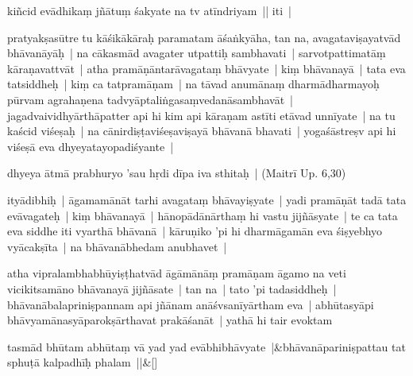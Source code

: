 \documentclass[article,12pt,a4paper]{memoir}%
\newcounter{parCount}
\begin{document}
	  
	  \pstart \leavevmode%
	kiñcid evādhikaṃ jñātuṃ śakyate na tv atīndriyam || iti | 
	{}
	\pend%
      

	  
	  \pstart \leavevmode%
	\label{thakur75-9.20}pratyakṣasūtre tu kāśikākāraḥ paramatam āśaṅkyāha, tan na, avagataviṣayatvād bhāvanāyāḥ | na cākasmād avagater utpattiḥ sambhavati | sarvotpattimatāṃ kāraṇavattvāt | atha pramāṇāntarāvagataṃ bhāvyate | kiṃ bhāvanayā | tata eva tatsiddheḥ | kiṃ ca tatpramāṇam | na tāvad anumānaṃ dharmādharmayoḥ pūrvam agrahaṇena tadvyāptaliṅgasaṃvedanāsambhavāt | jagadvaividhyārthāpatter api hi kim api kāraṇam astīti etāvad unnīyate | na tu kaścid viśeṣaḥ | na cānirdiṣṭaviśeṣaviṣayā bhāvanā bhavati | yogaśāstreṣv api hi viśeṣā eva dhyeyatayopadiśyante | 
	{}
	\pend%
      

	  
	  \pstart \leavevmode%
	dhyeya ātmā prabhuryo 'sau hṛdi dīpa iva sthitaḥ | (Maitrī Up. 6,30) 
	{}
	\pend%
      

	  
	  \pstart \leavevmode%
	ityādibhiḥ | āgamamānāt tarhi avagataṃ bhāvayiṣyate | yadi pramāṇāt tadā tata evāvagateḥ | kiṃ bhāvanayā | hānopādānārthaṃ hi vastu jijñāsyate | te ca tata eva siddhe iti vyarthā bhāvanā | kāruṇiko 'pi hi dharmāgamān eva śiṣyebhyo vyācakṣīta | na bhāvanābhedam anubhavet | 
	{}
	\pend%
      

	  
	  \pstart \leavevmode%
	\label{thakur75-10.3}atha vipralambhabhūyiṣṭhatvād āgāmānāṃ pramāṇam āgamo na veti vicikitsamāno bhāvanayā jijñāsate | tan na | tato 'pi tadasiddheḥ | bhāvanābalapriniṣpannam api jñānam anāśvsanīyārtham eva | abhūtasyāpi bhāvyamānasyāparokṣārthavat prakāśanāt | yathā hi tair evoktam 
	{}
	\pend%
      
	    
	    \stanza[\smallbreak]
	  tasmād bhūtam abhūtaṃ vā yad yad evābhibhāvyate |&bhāvanāpariniṣpattau tat sphuṭā kalpadhīḥ phalam ||\&[\smallbreak]
	  
\end{document}
